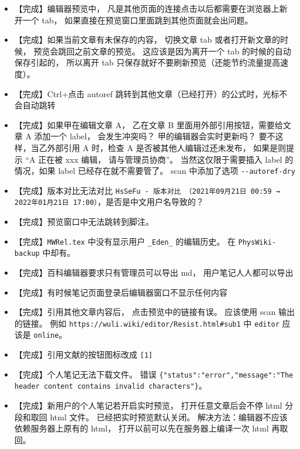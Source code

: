 \begin{itemize}
\item 【完成】编辑器预览中， 凡是其他页面的连接点击以后都需要在浏览器上新开一个 tab， 如果直接在预览窗口里面跳到其他页面就会出问题。

\item 【完成】如果当前文章有未保存的内容， 切换文章 tab 或者打开新文章的时候， 预览会跳回之前文章的预览。 这应该是因为离开一个 tab 的时候的自动保存引起的， 所以离开 tab 只保存就好不要刷新预览（还能节约流量提高速度）。

\item 【完成】Ctrl+点击 autoref 跳转到其他文章（已经打开）的公式时，光标不会自动跳转

\item 【完成】如果甲在编辑文章 A， 乙在文章 B 里面用外部引用按钮，需要给文章 A 添加一个 label， 会发生冲突吗？ 甲的编辑器会实时更新吗？ 要不这样，当乙外部引用 A 时，检查 A 是否被其他人编辑过还未发布， 如果是则提示 “A 正在被 xxx 编辑， 请与管理员协商”。 当然这仅限于需要插入 label 的情况，如果 label 已经存在就不需要管了。 scan 中添加了选项 \verb`--autoref-dry`

\item 【完成】版本对比无法对比 \verb`HsSeFu - 版本对比 （2021年09月21日 00:59 → 2022年01月21日 17:00）`，是否是中文用户名导致的？

\item 【完成】预览窗口中无法跳转到脚注。

\item 【完成】\verb`MWRel.tex` 中没有显示用户 \verb`_Eden_` 的编辑历史。 在 \verb`PhysWiki-backup` 中却有。

\item 【完成】百科编辑器要求只有管理员可以导出 md， 用户笔记人人都可以导出

\item 【完成】有时候笔记页面登录后编辑器窗口不显示任何内容

\item 【完成】引用其他文章内容后， 点击预览中的链接有误。 应该使用 scan 输出的链接。 例如 \verb`https://wuli.wiki/editor/Resist.html#sub1` 中 \verb`editor` 应该是 \verb`online`。

\item 【完成】引用文献的按钮图标改成 \verb`[1]`

\item 【完成】个人笔记无法下载文件。 错误 \verb`{"status":"error","message":"The header content contains invalid characters"}`。

\item 【完成】新用户的个人笔记若开启实时预览， 打开任意文章后会不停 html 分段和取回 html 文件。 已经把实时预览默认关闭。 解决方法：编辑器不应该依赖服务器上原有的 html， 打开以前可以先在服务器上编译一次 html 再取回。


\end{itemize}
